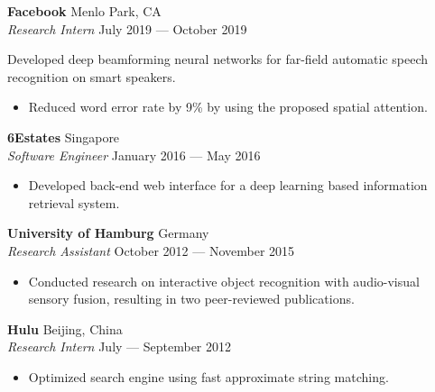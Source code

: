 \documentclass[a4paper,9pt]{extarticle} %
\begin{document}

\textbf{Facebook}  \hfill Menlo Park, CA\\
\textit{Research Intern} \hfill July 2019 --- October 2019%
\vspace{-.4\parskip}

Developed deep beamforming neural networks for far-field automatic speech recognition on smart speakers.
\vspace{-1.8\parskip}
\begin{itemize}[nosep]
  \item Reduced word error rate by 9\% by using the proposed spatial attention.
\end{itemize}


\textbf{6Estates}  \hfill Singapore \\
\textit{Software Engineer} \hfill January 2016 --- May 2016%
\vspace{-.4\parskip}

\begin{itemize}[nosep]
  \item Developed back-end web interface for a deep learning based information retrieval system.
\end{itemize}


\textbf{University of Hamburg} \hfill Germany \\
\textit{Research Assistant}  \hfill October 2012 --- November 2015%
\vspace{-.4\parskip}

\begin{itemize}[nosep]
  \item Conducted research on interactive object recognition with audio-visual sensory fusion, resulting in two peer-reviewed publications.
\end{itemize}


\textbf{Hulu} \hfill Beijing, China \\
\textit{Research Intern} \hfill July --- September 2012%
\vspace{-.5\parskip}

\begin{itemize}[nosep]
  \item Optimized search engine using fast approximate string matching.
\end{itemize}
\end{document}
